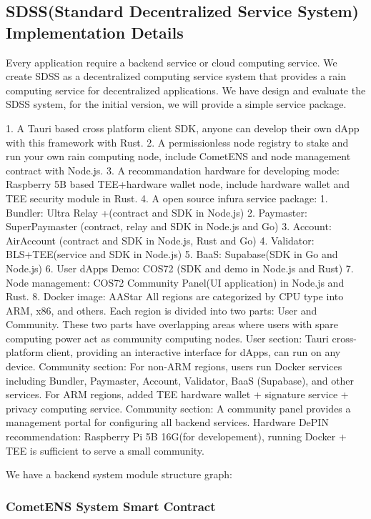 \documentclass[preprint,12pt]{elsarticle}
\begin{document}
\subsection{SDSS(Standard Decentralized Service System) Implementation Details}
\label{subsec:sdss-implementation}

Every application require a backend service or cloud computing service. We create SDSS as a decentralized computing service system that provides a rain computing service for decentralized applications. We have design and evaluate the SDSS system, for the initial version, we will provide a simple service package.

1. A Tauri based cross platform client SDK, anyone can develop their own dApp with this framework with Rust.
2. A permissionless node registry to stake and run your own rain computing node, include CometENS and node management contract with Node.js.
3. A recommandation hardware for developing mode: Raspberry 5B based TEE+hardware wallet node, include hardware wallet and TEE security module in Rust.
4. A open source infura service package:
   1. Bundler: Ultra Relay +(contract and SDK in Node.js)
   2. Paymaster: SuperPaymaster (contract, relay and SDK in Node.js and Go)
   3. Account: AirAccount (contract and SDK in Node.js, Rust and Go)
   4. Validator: BLS+TEE(service and SDK in Node.js)
   5. BaaS: Supabase(SDK in Go and Node.js)
   6. User dApps Demo: COS72 (SDK and demo in Node.js and Rust)
   7. Node management: COS72 Community Panel(UI application) in Node.js and Rust.
   8. Docker image: AAStar All regions are categorized by CPU type into ARM, x86, and others. Each region is divided into two parts: User and Community. These two parts have overlapping areas where users with spare computing power act as community computing nodes. User section: Tauri cross-platform client, providing an interactive interface for dApps, can run on any device. Community section: For non-ARM regions, users run Docker services including Bundler, Paymaster, Account, Validator, BaaS (Supabase), and other services. For ARM regions, added TEE hardware wallet + signature service + privacy computing service. Community section: A community panel provides a management portal for configuring all backend services. Hardware DePIN recommendation: Raspberry Pi 5B 16G(for developement), running Docker + TEE is sufficient to serve a small community. 

We have a backend system module structure graph:

\subsubsection{CometENS System Smart Contract}
\label{subsubsec:cometens-contract}
\end{document}
